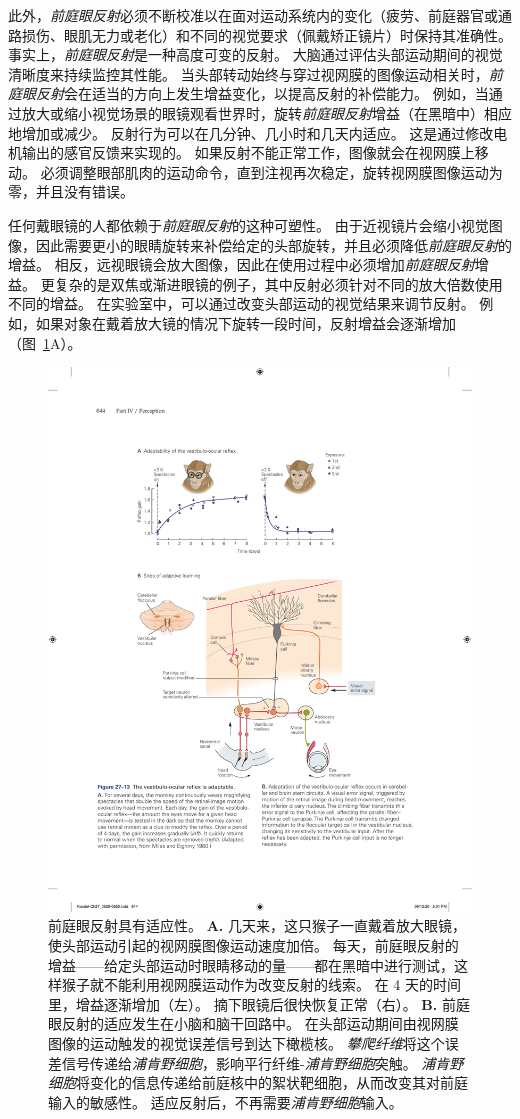 此外，\textit{前庭眼反射}必须不断校准以在面对运动系统内的变化（疲劳、前庭器官或通路损伤、眼肌无力或老化）和不同的视觉要求（佩戴矫正镜片）时保持其准确性。
事实上，\textit{前庭眼反射}是一种高度可变的反射。
大脑通过评估头部运动期间的视觉清晰度来持续监控其性能。
当头部转动始终与穿过视网膜的图像运动相关时，\textit{前庭眼反射}会在适当的方向上发生增益变化，以提高反射的补偿能力。
例如，当通过放大或缩小视觉场景的眼镜观看世界时，旋转\textit{前庭眼反射}增益（在黑暗中）相应地增加或减少。
反射行为可以在几分钟、几小时和几天内适应。
这是通过修改电机输出的感官反馈来实现的。
如果反射不能正常工作，图像就会在视网膜上移动。
必须调整眼部肌肉的运动命令，直到注视再次稳定，旋转视网膜图像运动为零，并且没有错误。


任何戴眼镜的人都依赖于\textit{前庭眼反射}的这种可塑性。
由于近视镜片会缩小视觉图像，因此需要更小的眼睛旋转来补偿给定的头部旋转，并且必须降低\textit{前庭眼反射}的增益。
相反，远视眼镜会放大图像，因此在使用过程中必须增加\textit{前庭眼反射}增益。
更复杂的是双焦或渐进眼镜的例子，其中反射必须针对不同的放大倍数使用不同的增益。
在实验室中，可以通过改变头部运动的视觉结果来调节反射。 
例如，如果对象在戴着放大镜的情况下旋转一段时间，反射增益会逐渐增加（图~\ref{fig:27_13}A）。


\begin{figure}[htbp]
	\centering
	\includegraphics[width=0.75\linewidth]{chap27/fig_27_13}
	\caption{前庭眼反射具有适应性。
		\textbf{A.} 几天来，这只猴子一直戴着放大眼镜，使头部运动引起的视网膜图像运动速度加倍。
		每天，前庭眼反射的增益——给定头部运动时眼睛移动的量——都在黑暗中进行测试，这样猴子就不能利用视网膜运动作为改变反射的线索。
		在 4 天的时间里，增益逐渐增加（左）。
		摘下眼镜后很快恢复正常（右）\cite{miles1980long}。
		\textbf{B.} 前庭眼反射的适应发生在小脑和脑干回路中。
		在头部运动期间由视网膜图像的运动触发的视觉误差信号到达下橄榄核。
		\textit{攀爬纤维}将这个误差信号传递给\textit{浦肯野细胞}，影响平行纤维-\textit{浦肯野细胞}突触。
		\textit{浦肯野细胞}将变化的信息传递给前庭核中的絮状靶细胞，从而改变其对前庭输入的敏感性。
		适应反射后，不再需要\textit{浦肯野细胞}输入。}
	\label{fig:27_13}
\end{figure}


